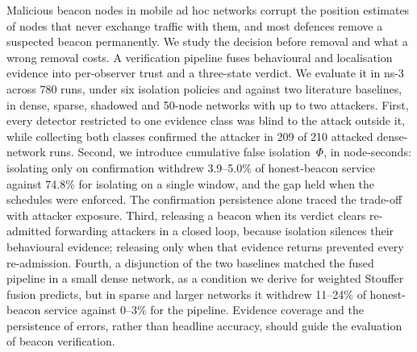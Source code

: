 Malicious beacon nodes in mobile ad hoc networks corrupt the position
estimates of nodes that never exchange traffic with them, and most defences
remove a suspected beacon permanently. We study the decision before removal
and what a wrong removal costs. A verification pipeline fuses behavioural and
localisation evidence into per-observer trust and a three-state verdict. We
evaluate it in ns-3 across 780 runs, under six isolation policies and against
two literature baselines, in dense, sparse, shadowed and 50-node networks
with up to two attackers. First, every detector restricted to one evidence
class was blind to the attack outside it, while collecting both classes
confirmed the attacker in 209 of 210 attacked dense-network runs.
Second, we introduce cumulative false isolation~$\Phi$, in node-seconds:
isolating only on confirmation withdrew 3.9--5.0\% of honest-beacon service
against 74.8\% for isolating on a single window, and the gap held when the
schedules were enforced. The confirmation
persistence alone traced the trade-off with attacker exposure. Third, releasing a beacon
when its verdict clears re-admitted forwarding attackers in a closed loop,
because isolation silences their behavioural evidence; releasing only when
that evidence returns prevented every re-admission. Fourth, a disjunction of
the two baselines matched the fused pipeline in a small dense network, as a
condition we derive for weighted Stouffer fusion predicts, but in sparse and
larger networks it withdrew 11--24\% of honest-beacon service against 0--3\%
for the pipeline. Evidence coverage and the persistence of errors, rather
than headline accuracy, should guide the evaluation of beacon verification.
